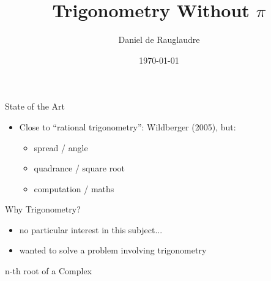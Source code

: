 \documentclass{beamer}
\title{Trigonometry Without $\pi$}
\author{Daniel de Rauglaudre}
\date{\today}
\begin{document}
\begin{frame}
    \titlepage
\end{frame}

\begin{frame}{}
\end{frame}

\begin{frame}{State of the Art}
  \begin{itemize}
    \item Close to ``rational trigonometry'': Wildberger
      (2005), but:
      \begin{itemize}
     \item spread / angle
      \item quadrance / square root
      \item computation / maths
      \end{itemize}
  \end{itemize}
\end{frame}

\begin{frame}{Why Trigonometry?}
  \begin{itemize}
  \item no particular interest in this subject...
  \item wanted to solve a problem involving trigonometry
  \end{itemize}
\end{frame}

\begin{frame}{n-th root of a Complex}
\end{frame}
\end{document}
